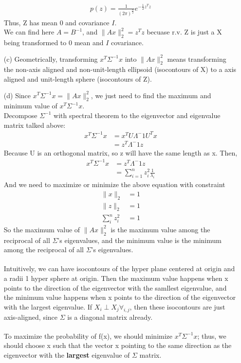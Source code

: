 \documentclass[11pt]{article}
\theoremstyle{quest}
\begin{document}
\begin{itemize}
\begin{align*}
p(z) = \frac{1}{(2\pi)^{\frac{n}{2}}}e^{-\frac{1}{2}z^{T}z}
\end{align*}
Thus, Z has mean 0 and covariance $I$.\\
We can find here $A = B^{-1}$, and $\lVert Ax\rVert_{2}^{2} = z^{T}z$ becuase r.v. Z is just a X being transformed to 0 mean and $I$ covariance.
\item[(c)]
Geometrically, transforming $x^{T}\Sigma^{-1}x$ into $\lVert Ax\rVert^{2}_{2}$ means transforming the non-axis aligned and non-unit-length ellipsoid (isocontours of X) to a axis aligned and unit-length sphere (isocontours of Z).
\item[(d)]
Since $x^{T}\Sigma^{-1}x = \lVert Ax\rVert_2^2$, we just need to find the maximum and minimum value of $x^{T}\Sigma^{-1}x$.\\
Decompose $\Sigma^{-1}$ with spectral theorem to the eigenvector and eigenvalue matrix talked above:
\begin{align*}
x^{T}\Sigma^{-1}x &= x^{T}U\Lambda^-1 U^{T}x\\
                  &= z^{T}\Lambda^-1 z
\end{align*}
Because U is an orthogonal matrix, so z will have the same length as x. Then,
\begin{align*}
x^{T}\Sigma^{-1}x &= z^{T}\Lambda^-1 z\\
									&= \sum_{i=1}^{n} z_i^2\frac{1}{\lambda_i}
\end{align*}
And we need to maximize or minimize the above equation with constraint
\begin{align*}
\lVert x\rVert_2 &= 1\\
\lVert z\rVert_2 &= 1\\
\sum_{i}^{n} z_i^2 &= 1
\end{align*}
So the maximum value of $\lVert Ax\rVert_2^2$ is the maximum value among the reciprocal of all $\Sigma$'s eigenvalues, and the minimum value is the minimum among the reciprocal of all $\Sigma$'s eigenvalues.
\\\\
Intuitively, we can have isocontours of the hyper plane centered at origin and a radii 1 hyper sphere at origin. Then the maximum value happens when x points to the direction of the eigenvector with the samllest eigenvalue, and the minimum value happens when x points to the direction of the eigenvector with the largest eigenvalue.
If $X_i \perp X_j \forall_{i,j}$, then these isocontours are just axis-aligned, since $\Sigma$ is a diagonal matrix already.
\\\\
To maximize the probability of f(x), we should minimize $x^{T}\Sigma^{-1}x$; thus, we should choose x such that the vector x pointing to the same direction as the eigenvector with the \textbf{largest} eigenvalue of $\Sigma$ matrix.
\end{itemize}
\newpage
\end{document}
